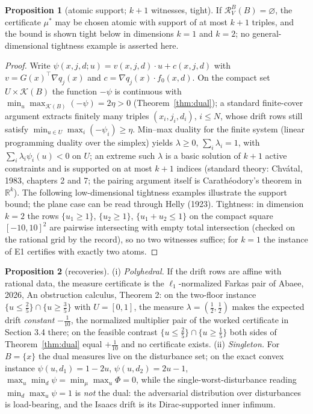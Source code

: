 \documentclass[10pt,twocolumn]{article}
\theoremstyle{definition}
\newtheorem{proposition}{Proposition}
\begin{document}
\begin{proposition}[atomic support; $k+1$ witnesses, tight]
\label{prop:sparse}
If $\mathcal{R}^{B}_{V}(B) = \varnothing$, the certificate $\mu^{*}$ may
be chosen atomic with support of at most $k+1$ triples, and the bound is shown tight below in dimensions $k=1$ and $k=2$;
no general-dimensional tightness example is asserted here.
\end{proposition}
\begin{proof}
Write $\psi(x,j,d;u) = v(x,j,d)\cdot u + c(x,j,d)$ with
$v = G(x)^{\top}\nabla q_{j}(x)$ and $c = \nabla q_{j}(x)\cdot f_{0}(x,d)$.
On the compact set $U \times \mathcal{K}(B)$ the function $-\psi$ is
continuous with
$\min_{u}\max_{\mathcal{K}(B)}(-\psi) = 2\eta > 0$ (Theorem~\ref{thm:dual});
a standard finite-cover argument extracts finitely many triples
$(x_{i},j_{i},d_{i})$, $i \le N$, whose drift rows still satisfy
$\min_{u \in U}\max_{i}(-\psi_{i}) \ge \eta$. Min--max duality for the
finite system (linear programming duality over the simplex) yields
$\lambda \ge 0$, $\sum_{i}\lambda_{i} = 1$, with
$\sum_{i}\lambda_{i}\psi_{i}(u) < 0$ on $U$; an extreme such
$\lambda$ is a basic solution of $k+1$ active constraints and is supported
on at most $k+1$ indices (standard theory: Chv\'{a}tal, 1983, chapters 2
and 7; the pairing argument itself is Carath\'eodory's theorem in
$\mathbb{R}^{k}$). The following low-dimensional tightness examples illustrate
the support bound; the plane case can be read through Helly (1923). Tightness: in dimension $k = 2$ the rows
$\{u_{1} \ge 1\}$, $\{u_{2} \ge 1\}$, $\{u_{1}+u_{2} \le 1\}$ on the
compact square $[-10,10]^{2}$ are pairwise intersecting with empty total
intersection (checked on the rational grid by the record), so no two
witnesses suffice; for $k = 1$ the instance of E1 certifies with exactly
two atoms.
\end{proof}

\begin{proposition}[recoveries]\label{prop:recover}
(i) \emph{Polyhedral.} If the drift rows are affine with rational data,
the measure certificate is the $\ell_{1}$-normalized Farkas pair of
Abaee, 2026, An obstruction calculus, Theorem 2: on the two-floor instance
$\{u \le \tfrac25\} \cap \{u \ge \tfrac35\}$ with $U = [0,1]$, the
measure $\lambda = (\tfrac12,\tfrac12)$ makes the expected drift
\emph{constant} $-\tfrac1{10}$, the normalized multiplier pair of the
worked certificate in Section 3.4 there; on the feasible contrast
$\{u \le \tfrac25\} \cap \{u \ge \tfrac15\}$ both sides of
Theorem~\ref{thm:dual} equal $+\tfrac1{10}$ and no certificate exists.
(ii) \emph{Singleton.} For $B = \{x\}$ the dual measures live on the
disturbance set; on the exact convex instance
$\psi(u,d_{1}) = 1-2u$, $\psi(u,d_{2}) = 2u-1$,
$\max_{u}\min_{d}\psi = \min_{\mu}\max_{u}\Phi = 0$, while the
single-worst-disturbance reading $\min_{d}\max_{u}\psi = 1$ is
\emph{not} the dual: the adversarial distribution over disturbances is
load-bearing, and the Isaacs drift is its Dirac-supported inner
infimum.
\end{proposition}
\end{document}
